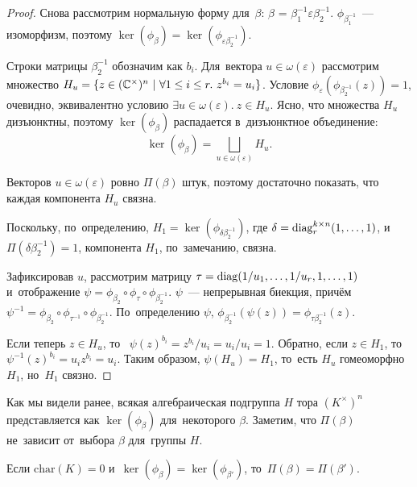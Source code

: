 \begin{proof}
  Снова рассмотрим нормальную форму для~$\beta$: $\beta$ = $\beta_1^{-1} \varepsilon \beta_2^{-1}$.
  $\phi_{\beta_1^{-1}}$~— изоморфизм, поэтому $\ker(\phi_{\beta}) = \ker(\phi_{\varepsilon \beta_2^{-1}})$.

  Строки матрицы $\beta_2^{-1}$ обозначим как $b_i$.
  Для~вектора $u \in \omega(\varepsilon)$ рассмотрим множество $H_u = \{z \in (\mathbb{C}^\times)^n \ | \ \forall 1 \leq i \leq r.\ z^{b_i} = u_i\}$.
  Условие $\phi_\varepsilon(\phi_{\beta_2^{-1}}(z)) = 1$, очевидно, эквивалентно условию $\exists u \in \omega(\varepsilon).\ z \in H_u$.
  Ясно, что множества $H_u$ дизъюнктны, поэтому $\ker(\phi_{\beta})$ распадается в~дизъюнктное объединение:
  \[
    \ker(\phi_{\beta}) = \bigsqcup_{u \in \omega(\varepsilon)} H_u.
  \]

  Векторов $u \in \omega(\varepsilon)$ ровно $\Pi(\beta)$ штук, поэтому достаточно показать, что каждая компонента $H_u$ связна.

  Поскольку, по~определению, $H_1 = \ker(\phi_{\delta \beta_2^{-1}})$, где $\delta = \mathrm{diag}^{k \times n}_r(1, \ldots, 1)$,
  и~$\Pi(\delta \beta_2^{-1}) = 1$, компонента $H_1$, по~замечанию, связна.

  Зафиксировав $u$, рассмотрим матрицу $\tau = \mathrm{diag}(1 / u_1, \ldots, 1 / u_r, 1, \ldots, 1)$ и~отображение $\psi = \phi_{\beta_2} \circ \phi_\tau \circ \phi_{\beta_2^{-1}}$.
  $\psi$~— непрерывная биекция, причём $\psi^{-1} = \phi_{\beta_2} \circ \phi_{\tau^{-1}} \circ \phi_{\beta_2^{-1}}$.
  По~определению $\psi$, $\phi_{\beta_2^{-1}}(\psi(z)) = \phi_{\tau \beta_2^{-1}}(z)$.

  Если теперь $z \in H_u$, то~ $\psi(z)^{b_i} = z^{b_i} / u_i = u_i / u_i = 1$. Обратно, если $z \in H_1$,
  то~$\psi^{-1}(z)^{b_i} = u_i z^{b_i} = u_i$. Таким образом, $\psi(H_u) = H_1$,
  то~есть $H_u$ гомеоморфно $H_1$, но~$H_1$ связно.
\end{proof}

Как мы видели ранее, всякая алгебраическая подгруппа $H$ тора $(K^\times)^n$ представляется как $\ker(\phi_\beta)$
для~некоторого $\beta$. Заметим, что $\Pi(\beta)$ не~зависит от~выбора $\beta$ для~группы $H$.

\begin{theorem}
  Если $\mathrm{char}(K) = 0$ и~$\ker(\phi_{\beta}) = \ker(\phi_{\beta'})$, то~$\Pi(\beta) = \Pi(\beta')$.
\end{theorem}

